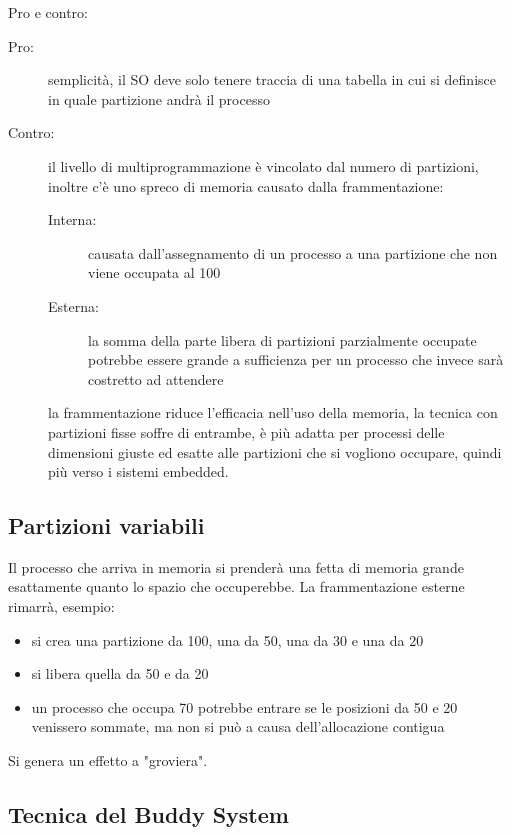 \documentclass[a4paper, 12pt]{book}
\begin{document}
Pro e contro:

\begin{description}
    \item[Pro:] semplicità, il SO deve solo tenere traccia di una tabella in cui si definisce in quale partizione andrà il processo
    \item[Contro:] il livello di multiprogrammazione è vincolato dal numero di partizioni, inoltre c'è uno spreco di memoria causato
    dalla frammentazione:
    
    \begin{description}
        \item[Interna:] causata dall'assegnamento di un processo a una partizione che non viene occupata al 100%
        \item[Esterna:] la somma della parte libera di partizioni parzialmente occupate potrebbe essere grande a sufficienza
        per un processo che invece sarà costretto ad attendere 
    \end{description}
    la frammentazione riduce l'efficacia nell'uso della memoria, la tecnica con partizioni fisse soffre di entrambe, è più adatta per
    processi delle dimensioni giuste ed esatte alle partizioni che si vogliono occupare, quindi più verso i sistemi embedded.
\end{description}

\subsection{Partizioni variabili}

Il processo che arriva in memoria si prenderà una fetta di memoria grande esattamente quanto lo spazio che occuperebbe.
La frammentazione esterne rimarrà, esempio:

\begin{itemize}
    \item si crea una partizione da 100, una da 50, una da 30 e una da 20
    \item si libera quella da 50 e da 20
    \item un processo che occupa 70 potrebbe entrare se le posizioni da 50 e 20 venissero sommate, ma non si può a causa dell'allocazione contigua
\end{itemize}

Si genera un effetto a "groviera". 
 
\subsection{Tecnica del Buddy System}
\end{document}
